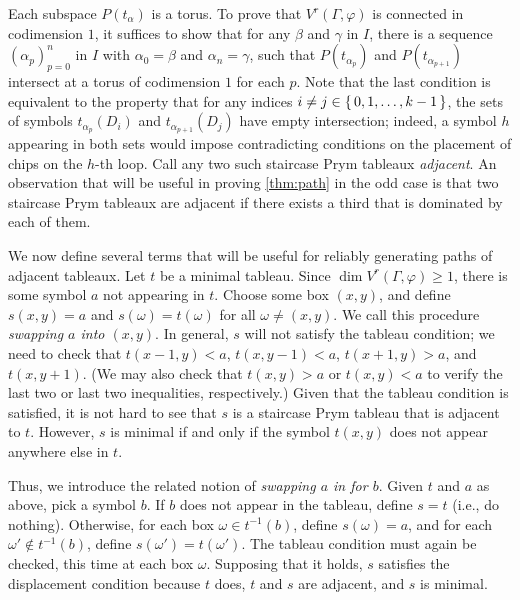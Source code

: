\documentclass[11pt,reqno]{amsart}
\newcommand*{\Z}{\mathbb{Z}}
\newcommand{\yoav}[1]{{\color{blue} \sf  Yo$\alpha$v: [#1]}}
\newcommand{\caelan}[1]{\textcolor{orange}{\sf C: [#1]}}
\theoremstyle{definition}
\theoremstyle{problem}
\theoremstyle{plain}
\theoremstyle{remark}
\theoremstyle{theorem}
\numberwithin{equation}{section}
\numberwithin{figure}{section}
\begin{document}
Each subspace $P(t_\alpha)$ is a torus.
 To prove that $V^r(\Gamma,\varphi)$ is
 connected in codimension $1$, it suffices to show that for any $\beta$ and $\gamma$ in $I$, there
is a sequence $(\alpha_p)_{p=0}^n$ in $I$ with $\alpha_0 = \beta$
and $\alpha_n = \gamma$, such that $P(t_{\alpha_p})$ and
$P(t_{\alpha_{p+1}})$ intersect at a torus of codimension $1$ for each $p$.
Note that the last condition is equivalent to the property that for
any indices $i \neq j \in \set{0,1,\ldots,k-1}$, the sets of symbols
$t_{\alpha_p}(D_i)$ and $t_{\alpha_{p+1}}(D_j)$ have empty
intersection; indeed, a symbol $h$ appearing in both sets would impose
contradicting conditions on the placement of chips on the $h$-th loop.
Call any two such staircase Prym tableaux \textit{adjacent}.  An
observation that will be useful in proving \cref{thm:path} in the odd
case is that two staircase Prym tableaux are adjacent if there exists
a third that is dominated by each of them.

We now define several terms that will be useful for reliably
generating paths of adjacent tableaux.  Let $t$ be a minimal tableau.
Since $\dim V^r(\Gamma,\varphi) \geq 1$, there is some symbol $a$ not
appearing in $t$.  Choose some box $(x,y)$, and define $s(x,y) = a$
and $s(\omega) = t(\omega)$ for all $\omega \neq (x,y)$.  We call this
procedure \textit{swapping $a$ into $(x,y)$}.  In general, $s$ will
not satisfy the tableau condition; we need to check that
$t(x-1,y) < a$, $t(x,y-1) < a$, $t(x+1,y) > a$, and $t(x,y+1)$.  (We
may also check that $t(x,y) > a$ or $t(x,y) < a$ to verify the last
two or last two inequalities, respectively.)  Given that the tableau
condition is satisfied, it is not hard to see that $s$ is a staircase
Prym tableau that is adjacent to $t$.  However, $s$ is minimal if and
only if the symbol $t(x,y)$ does not appear anywhere else in $t$.

Thus, we introduce the related notion of \textit{swapping $a$ in for
  $b$}.  Given $t$ and $a$ as above, pick a symbol $b$.  If $b$ does
not appear in the tableau, define $s = t$ (i.e., do nothing).
Otherwise, for each box $\omega \in t^{-1}(b)$, define
$s(\omega) = a$, and for each $\omega' \nin t^{-1}(b)$, define
$s(\omega') = t(\omega')$.  The tableau condition must again be
checked, this time at each box $\omega$.  Supposing that it holds, $s$
satisfies the displacement condition because $t$ does, $t$ and $s$ are
adjacent, and $s$ is minimal.
\end{document}
